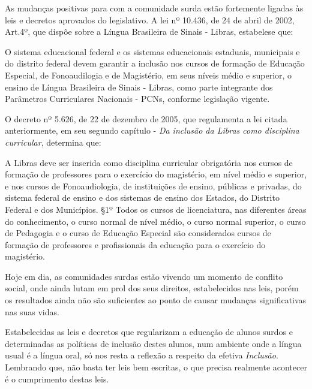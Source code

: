 \documentclass[brasil]{abnt}
\begin{document}
		As mudanças positivas para com a comunidade surda estão fortemente ligadas às leis e decretos aprovados do legislativo. A lei nº 10.436, de 24 de abril de 2002, Art.4º, que dispõe sobre a 
		Língua Brasileira de Sinais - Libras, estabelese que:
		
			\begin{citacao} O sistema educacional federal e os sistemas educacionais estaduais, municipais e do distrito federal devem garantir a inclusão nos cursos de formação de Educação Especial, de 
							Fonoaudilogia e de Magistério, em seus níveis médio e superior, o ensino de Língua Brasileira de Sinais - Libras, como parte integrante dos Parâmetros Curriculares Nacionais - PCNs,
							conforme legislação vigente.
			\end{citacao}
		
		O decreto nº 5.626, de 22 de dezembro de 2005, que regulamenta a lei citada anteriormente, em seu segundo capítulo - \textit{Da inclusão da Libras como disciplina curricular}, determina que:
		
			\begin{citacao} A Libras deve ser inserida como disciplina curricular obrigatória nos cursos de formação de professores para o exercício do magistério, em nível médio e superior, e nos cursos de Fonoaudiologia, 
							de instituições de ensino, públicas e privadas, do sistema federal de ensino e dos sistemas de ensino dos Estados, do Distrito Federal e dos Municípios.
							\S 1º Todos os cursos de licenciatura, nas diferentes áreas do conhecimento, o curso normal de nível médio, o curso normal superior, o curso de Pedagogia e o curso de Educação Especial são
							considerados cursos de formação de professores e profissionais da educação para o exercício do magistério. 
			\end{citacao}
			
		Hoje em dia, as comunidades surdas estão vivendo um momento de conflito social, onde ainda lutam em prol dos seus direitos, estabelecidos nas leis, porém os resultados ainda não são suficientes ao ponto de causar 
		mudanças significativas nas suas vidas. 
		
		Estabelecidas as leis e decretos que regularizam a educação de alunos surdos e determinadas as políticas de inclusão destes alunos, num ambiente onde a língua usual é a língua oral, só nos resta a reflexão
		a respeito da efetiva \textit{Inclusão}. Lembrando que, não basta ter leis bem escritas, o que precisa realmente acontecer é o cumprimento destas leis. 
		
\end{document}

